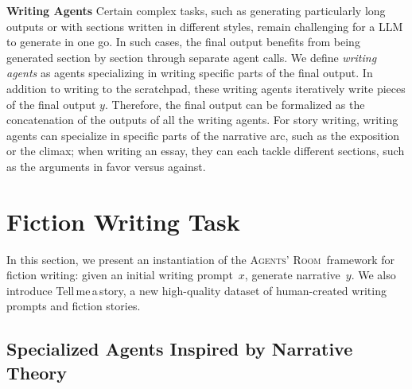 \documentclass{article}
\newcommand{\Agentsroom}{\textsc{Agents' Room}}
\newcommand{\tellmeastory}{{\sc Tell$\,$me$\,$a$\,$story}}
\newcommand{\fantine}[1]{{\textcolor{blue}{\bf{Fantine:} \emph{#1}}}}
\newcommand{\mirella}[1]{{\textcolor{cyan}{\bf{Mirella:} \emph{#1}}}}
\newcommand{\jenni}[1]{{\textcolor{violet}{\bf{Jenni:} \emph{#1}}}}
\begin{document}
\textbf{Writing Agents} Certain complex tasks, such as generating particularly long outputs or with sections written in different styles, remain challenging for a LLM to generate in one go. In such cases, the final output benefits from being generated section by section through separate agent calls. We define {\it writing agents} as agents specializing in writing specific parts of the final output. In addition to writing to the scratchpad, these writing agents iteratively write pieces of the final output $y$. Therefore, the final output can be formalized as the concatenation of the outputs of all the writing agents. For story writing, writing agents can specialize in specific parts of the narrative arc, such  as the exposition or the climax; when writing an essay, they can each tackle different sections, such as the arguments in favor versus against. 




\section{Fiction Writing Task}

In this section, we present an instantiation of the
\Agentsroom\ framework for fiction writing: given an initial writing
prompt~$x$, generate narrative~$y$. We also introduce \tellmeastory \footnotemark[1], a
new high-quality dataset of human-created writing prompts and fiction
stories.




\subsection{Specialized Agents Inspired by Narrative Theory}
\label{sec:fiction_agents}

\end{document}
